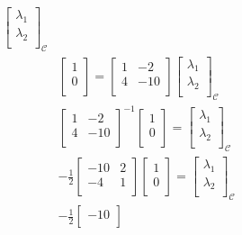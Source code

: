 \documentclass{report}
\begin{document}
{\begin{align*}
\begin{bmatrix}
     \lambda_1\\
     \lambda_2\\
     \end{bmatrix}
     _{ \mathcal{C}}\\
     & \begin{bmatrix}
     1\\
     0\\
     \end{bmatrix}
     = \begin{bmatrix}
     1 & -2\\
     4 & -10\\
     \end{bmatrix} \begin{bmatrix}
     \lambda_1\\
     \lambda_2\\
     \end{bmatrix}
     _{ \mathcal{C}} \\
     &  \begin{bmatrix}
     1 & -2\\
     4 & -10\\
     \end{bmatrix}^{-1} \begin{bmatrix}
     1\\
     0\\
     \end{bmatrix}
     = \begin{bmatrix}
     \lambda_1\\
     \lambda_2\\
     \end{bmatrix} _{ \mathcal{C}}\\
     &  - \frac{ 1  }{ 2 } \begin{bmatrix}
     -10 & 2\\
     -4 & 1\\
     \end{bmatrix} \begin{bmatrix}
     1\\
     0\\
     \end{bmatrix}         = \begin{bmatrix}
     \lambda_1\\
     \lambda_2\\
     \end{bmatrix}
     _{ \mathcal{C}}\\
     &  - \frac{ 1  }{ 2 }  \begin{bmatrix}
     -10\\

\end{bmatrix}
\end{align*}}
\end{document}
